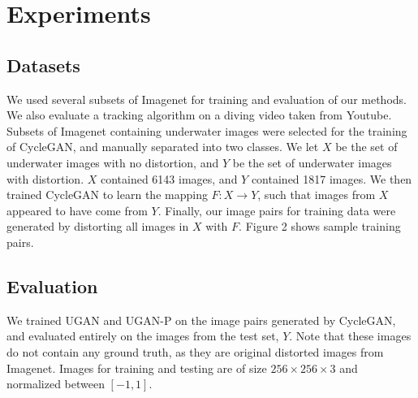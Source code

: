 \documentclass[conference,reqno]{IEEEtran}
\begin{document}
\section{Experiments}
\subsection{Datasets}
We used several subsets of Imagenet \cite{deng2009imagenet} for training and evaluation of our methods. We also
evaluate a tracking algorithm on a diving video taken from Youtube. Subsets of Imagenet containing underwater images
were selected for the training of CycleGAN, and manually separated into two classes. We let $X$ be the set of
underwater images with no distortion, and $Y$ be the set of underwater images with distortion. $X$ contained 6143
images, and $Y$ contained 1817 images. We then trained CycleGAN to learn the mapping $F: X \rightarrow Y$, such that
images from $X$ appeared to have come from $Y$. Finally, our image pairs for training data were generated by distorting
all images in $X$ with $F$. Figure 2 shows sample training pairs.

\subsection{Evaluation}
We trained UGAN and UGAN-P on the image pairs generated by CycleGAN, and evaluated entirely on the images from the
test set, $Y$. Note that these images do not contain any ground truth, as they are original distorted images from
Imagenet. Images for training and testing are of size $256 \times 256 \times 3$ and normalized between $[-1, 1]$.

\end{document}
